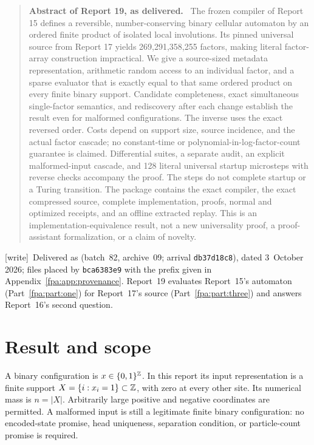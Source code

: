 \documentclass[11pt,a4paper]{article}
\numberwithin{equation}{section}
\newcommand{\wtag}{\textup{[write]}}
\newenvironment{reportabstract}[1]{\begin{quote}\small\textbf{Abstract of Report #1, as delivered.}\ }{\end{quote}}
\begin{document}
\begin{reportabstract}{19}
The frozen compiler of Report 15 defines a reversible, number-conserving binary cellular automaton by an ordered finite product of isolated local involutions. Its pinned universal source from Report 17 yields 269,291,358,255 factors, making literal factor-array construction impractical. We give a source-sized metadata representation, arithmetic random access to an individual factor, and a sparse evaluator that is exactly equal to that same ordered product on every finite binary support. Candidate completeness, exact simultaneous single-factor semantics, and rediscovery after each change establish the result even for malformed configurations. The inverse uses the exact reversed order. Costs depend on support size, source incidence, and the actual factor cascade; no constant-time or polynomial-in-log-factor-count guarantee is claimed. Differential suites, a separate audit, an explicit malformed-input cascade, and 128 literal universal startup microsteps with reverse checks accompany the proof. The steps do not complete startup or a Turing transition. The package contains the exact compiler, the exact compressed source, complete implementation, proofs, normal and optimized receipts, and an offline extracted replay. This is an implementation-equivalence result, not a new universality proof, a proof-assistant formalization, or a claim of novelty.
\end{reportabstract}

\wtag\ Delivered as  (batch~82, archive~09; arrival \texttt{db37d18c8}), dated 3~October 2026; files placed by \texttt{bca6383e9} with the prefix given in Appendix~\ref{fpa:app:provenance}. Report~19 evaluates Report~15's automaton (Part~\ref{fpa:part:one}) for Report~17's source (Part~\ref{fpa:part:three}) and answers Report~16's second question.

\section{Result and scope}\label{fpa:rep:19:first}
A binary configuration is $x\in\{0,1\}^{\mathbb Z}$. In this report its input representation is a finite support $X=\{i:x_i=1\}\subset\mathbb Z$, with zero at every other site. Its numerical mass is $n=|X|$. Arbitrarily large positive and negative coordinates are permitted. A malformed input is still a legitimate finite binary configuration: no encoded-state promise, head uniqueness, separation condition, or particle-count promise is required.
\end{document}
